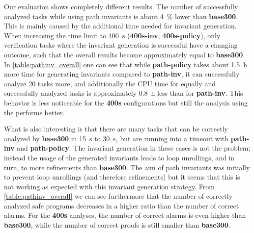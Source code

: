 Our evaluation shows completely different results. The number of successfully analyzed tasks while using path invariants is about \SI{4}{\percent} lower than \textbf{base300}.
This is mainly caused by the additional time needed for invariant generation. When increasing the time limit to \SI{400}{\second} (\textbf{400s-inv}, \textbf{400s-policy}),
only verification tasks where the invariant generation is successful have a changing outcome, such that the overall results become approximately equal to \textbf{base300}. In
\autoref{table:pathinv_overall} one can see that while \textbf{path-policy} takes about \SI{1.5}{\hour} more time for generating invariants compared to \textbf{path-inv}, it
can successfully analyze \num{20} tasks more, and additionally the CPU time for equally and successfully analyzed tasks is approximately \SI{0.8}{\hour} less than for
\textbf{path-inv}. This behavior is less noticeable for the \textbf{400s} configurations but still the analysis using the \PolicyCPA{} performs better.

What is also interesting is that there are many tasks that can be correctly analyzed by \textbf{base300} in \SI{15}{\second} to \SI{30}{\second}, but are running into a timeout with \textbf{path-inv} and 
\textbf{path-policy}. The invariant generation in these cases is not the problem; instead the usage of the generated invariants leads to loop unrollings, and in turn, to more refinements than 
\textbf{base300}. The aim of path invariants was initially to prevent loop unrollings (and therefore refinements) but it seems that this is not working as expected with this invariant generation 
strategy. From \autoref{table:pathinv_overall} we can see furthermore that the number of correctly analyzed safe programs decreases in a higher ratio than the number of correct alarms. For the \textbf{400s} 
analyses, the number of correct alarms is even higher than \textbf{base300}, while the number of correct proofs is still smaller than \textbf{base300}.

